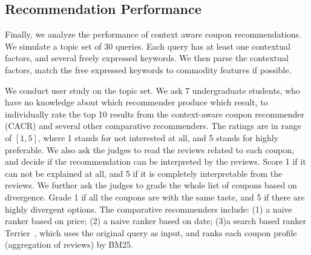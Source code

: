 \documentclass[preprint,12pt]{elsarticle}
\begin{document}
\subsection{Recommendation Performance}
Finally, we analyze the performance of context aware coupon recommendations. We simulate a topic set of 30 queries. Each query has at least one contextual factors, and several freely expressed keywords. We then parse the contextual factors, match the free expressed keywords to commodity features if possible. %
%

We conduct user study on the topic set. We ask 7 undergraduate students, who have no knowledge about which recommender produce which result, to individually rate the top 10 results from the context-aware coupon recommender (CACR) and several other comparative recommenders. The ratings are in range of $[1,5]$, where 1 stands for not interested at all, and 5 stands for highly preferable. We also ask the judges to read the reviews related to each coupon, and decide if the recommendation can be interpreted by the reviews. Score 1 if it can not be explained at all, and 5 if it is completely interpretable from the reviews. We further ask the judges to grade the whole list of coupons based on divergence. Grade 1 if all the coupons are with the same taste, and 5 if there are highly divergent options. The comparative recommenders include: (1) a naive ranker based on price; (2) a naive ranker based on date; (3)a search based ranker Terrier~\cite{Ounis2006Terrier}, which uses the original query as input, and ranks each coupon profile (aggregation of reviews) by BM25.
\end{document}

